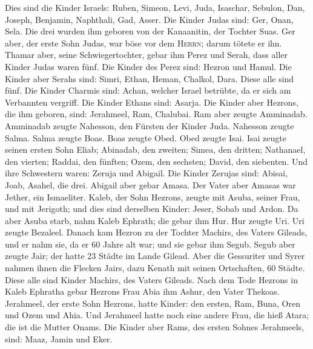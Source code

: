  Dies sind die Kinder Israels: Ruben, Simeon, Levi, Juda,
Isaschar, Sebulon,  Dan, Joseph, Benjamin, Naphthali, Gad,
Asser.  Die Kinder Judas sind: Ger, Onan, Sela. Die drei
wurden ihm geboren von der Kanaanitin, der Tochter Suas. Ger aber, der
erste Sohn Judas, war böse vor dem \textsc{Herrn}; darum tötete er ihn.
 Thamar aber, seine Schwiegertochter, gebar ihm Perez und
Serah, dass aller Kinder Judas waren fünf.  Die Kinder des
Perez sind: Hezron und Hamul.  Die Kinder aber Serahs
sind: Simri, Ethan, Heman, Chalkol, Dara. Diese alle sind fünf.
 Die Kinder Charmis sind: Achan, welcher Israel betrübte,
da er sich am Verbannten vergriff.  Die Kinder Ethans
sind: Asarja.  Die Kinder aber Hezrons, die ihm geboren,
sind: Jerahmeel, Ram, Chalubai.  Ram aber zeugte
Amminadab. Amminadab zeugte Nahesson, den Fürsten der Kinder Juda.
 Nahesson zeugte Salma. Salma zeugte Boas.
 Boas zeugte Obed. Obed zeugte Isai.  Isai
zeugte seinen ersten Sohn Eliab; Abinadab, den zweiten; Simea, den
dritten;  Nathanael, den vierten; Raddai, den fünften;
 Ozem, den sechsten; David, den siebenten.
 Und ihre Schwestern waren: Zeruja und Abigail. Die
Kinder Zerujas sind: Abisai, Joab, Asahel, die drei. 
Abigail aber gebar Amasa. Der Vater aber Amasas war Jether, ein
Ismaeliter.  Kaleb, der Sohn Hezrons, zeugte mit Asuba,
seiner Frau, und mit Jerigoth; und dies sind derselben Kinder: Jeser,
Sobab und Ardon.  Da aber Asuba starb, nahm Kaleb
Ephrath; die gebar ihm Hur.  Hur zeugte Uri. Uri zeugte
Bezaleel.  Danach kam Hezron zu der Tochter Machirs, des
Vaters Gileads, und er nahm sie, da er 60 Jahre alt war; und sie gebar
ihm Segub.  Segub aber zeugte Jair; der hatte 23 Städte
im Lande Gilead.  Aber die Gessuriter und Syrer nahmen
ihnen die Flecken Jairs, dazu Kenath mit seinen Ortschaften, 60 Städte.
Diese alle sind Kinder Machirs, des Vaters Gileads.  Nach
dem Tode Hezrons in Kaleb Ephratha gebar Hezrons Frau Abia ihm Ashur,
den Vater Thekoas.  Jerahmeel, der erste Sohn Hezrons,
hatte Kinder: den ersten, Ram, Buna, Oren und Ozem und Ahia.
 Und Jerahmeel hatte noch eine andere Frau, die hieß
Atara; die ist die Mutter Onams.  Die Kinder aber Rams,
des ersten Sohnes Jerahmeels, sind: Maaz, Jamin und Eker.
